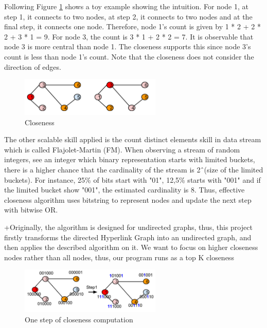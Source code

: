 Following Figure \ref{fig3} shows a toy example showing the intuition. For node 1, at step 1, it connects to two nodes, at step 2, it connects to two nodes and at the final step, it  connects one node. Therefore, node 1’s count is given by 1 * 2 + 2 * 2 + 3 * 1 = 9. For node 3, the count is 3 * 1 + 2 * 2 = 7. It is observable that node 3 is more central than node 1. The closeness supports this since node 3’s count is less than node 1’s count. Note that the closeness does not consider the direction of edges.

\begin{figure}[H]
	\begin{center}
		\caption{Closeness}	
		\label{fig3}		
		\includegraphics[width=0.6\textwidth]{fig3}	
	\end{center}
\end{figure}

The other scalable skill applied is the count distinct elements skill in data stream which is called Flajolet-Martin (FM).  When observing a stream of random integers, see an integer which binary representation starts with limited buckets, there is a higher chance that the cardinality of the stream is 2\^\ (size of the limited buckets). For instance, 25\% of bits start with "01", 12,5\% starts with "001" and if the limited bucket show "001", the estimated cardinality is 8. Thus, effective closeness algorithm uses bitstring to represent nodes and update the next step with bitwise OR. 

+Originally, the algorithm is designed for undirected graphs, thus, this project firstly transforms the directed Hyperlink Graph into an undirected graph, and then applies the described algorithm on it. We want to focus on higher closeness nodes rather than all nodes, thus, our program runs as a top K closeness

\begin{figure}[H]
	\begin{center}
		\caption{One step of closeness computation}		
		\label{fig4}		
		\includegraphics[width=0.6\textwidth]{fig4}	
	\end{center}
\end{figure}

